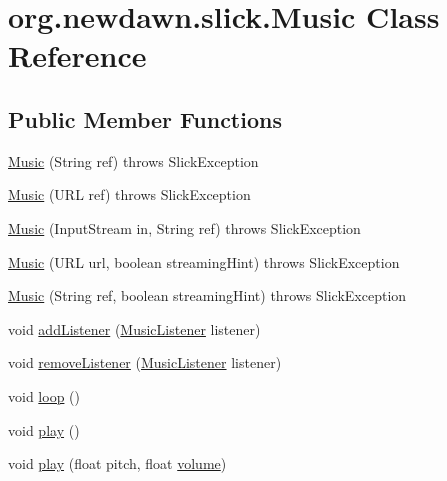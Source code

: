 \hypertarget{classorg_1_1newdawn_1_1slick_1_1_music}{}\section{org.\+newdawn.\+slick.\+Music Class Reference}
\label{classorg_1_1newdawn_1_1slick_1_1_music}
\subsection*{Public Member Functions}
\begin{DoxyCompactItemize}
\item 
\mbox{\hyperlink{classorg_1_1newdawn_1_1slick_1_1_music_a6a8d9426a6c0070efcd19ba03d218a89}{Music}} (String ref)  throws Slick\+Exception 
\item 
\mbox{\hyperlink{classorg_1_1newdawn_1_1slick_1_1_music_a53829cfbe22f4a70e1cec04763ef9503}{Music}} (U\+RL ref)  throws Slick\+Exception 
\item 
\mbox{\hyperlink{classorg_1_1newdawn_1_1slick_1_1_music_ab50cfd31e4ecf9c4da88bfd1294cfd12}{Music}} (Input\+Stream in, String ref)  throws Slick\+Exception 
\item 
\mbox{\hyperlink{classorg_1_1newdawn_1_1slick_1_1_music_acc662b7dce73c0103286797e1446fe46}{Music}} (U\+RL url, boolean streaming\+Hint)  throws Slick\+Exception 
\item 
\mbox{\hyperlink{classorg_1_1newdawn_1_1slick_1_1_music_a726446e0ec108da9d7e93db9a2738439}{Music}} (String ref, boolean streaming\+Hint)  throws Slick\+Exception 
\item 
void \mbox{\hyperlink{classorg_1_1newdawn_1_1slick_1_1_music_a86c7f8a44c5d7a7f3226a1211b7d2b65}{add\+Listener}} (\mbox{\hyperlink{interfaceorg_1_1newdawn_1_1slick_1_1_music_listener}{Music\+Listener}} listener)
\item 
void \mbox{\hyperlink{classorg_1_1newdawn_1_1slick_1_1_music_a30daef9a8ca722cd5adc80252e332c47}{remove\+Listener}} (\mbox{\hyperlink{interfaceorg_1_1newdawn_1_1slick_1_1_music_listener}{Music\+Listener}} listener)
\item 
void \mbox{\hyperlink{classorg_1_1newdawn_1_1slick_1_1_music_aadc35375936c47d7a0e40cd1d719d070}{loop}} ()
\item 
void \mbox{\hyperlink{classorg_1_1newdawn_1_1slick_1_1_music_a605a881eef7e5a4cca79cdeec7234fd0}{play}} ()
\item 
void \mbox{\hyperlink{classorg_1_1newdawn_1_1slick_1_1_music_ac9d025e830a97f7a14a08fe5b3342324}{play}} (float pitch, float \mbox{\hyperlink{classorg_1_1newdawn_1_1slick_1_1_music_a2fa10b80767b1a05925e1dc89a088e90}{volume}})

\end{DoxyCompactItemize}
